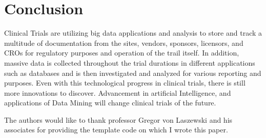 \documentclass[sigconf]{acmart}
\begin{document}
\section{Conclusion} 
Clinical Trials are utilizing big data applications and analysis to store and track a multitude of documentation from the sites, vendors, sponsors, licensors, and CROs for regulatory purposes and operation of the trail itself. 
In addition, massive data is collected throughout the trial durations in different applications such as databases and is then investigated and analyzed for various reporting and purposes. 
Even with this technological progress in clinical trials, there is still more innovations to discover. 
Advancement in artificial Intelligence, and applications of Data Mining will change clinical trials of the future. 
 
\begin{acks}

The authors would like to thank professor Gregor von Laszewski and his associates for providing the template code on which I wrote this paper.

\end{acks}


 


\end{document}
